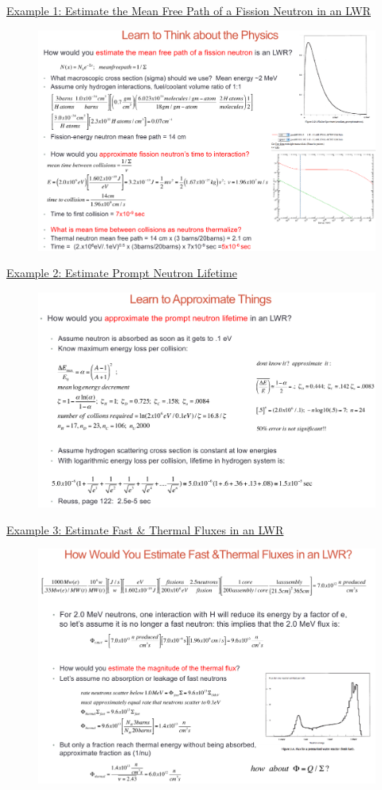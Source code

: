 \documentclass{school-22.211-notes}
\begin{document}
\clearpage
{}
\uline{Example 1: Estimate the Mean Free Path of a Fission Neutron in an LWR} 
\begin{figure}[ht]
  \centering
  \includegraphics[width=5.5in]{images/intro/lec1-example1.png}
\end{figure}

\clearpage
\uline{Example 2: Estimate Prompt Neutron Lifetime}
\begin{figure}[ht]
  \centering
  \includegraphics[width=4.5in]{images/intro/lec1-example2.png}
\end{figure}

\uline{Example 3: Estimate Fast \& Thermal Fluxes in an LWR}
\begin{figure}[ht]
  \centering
  \includegraphics[width=4.5in]{images/intro/lec1-example3.png}
\end{figure}
\end{document}
